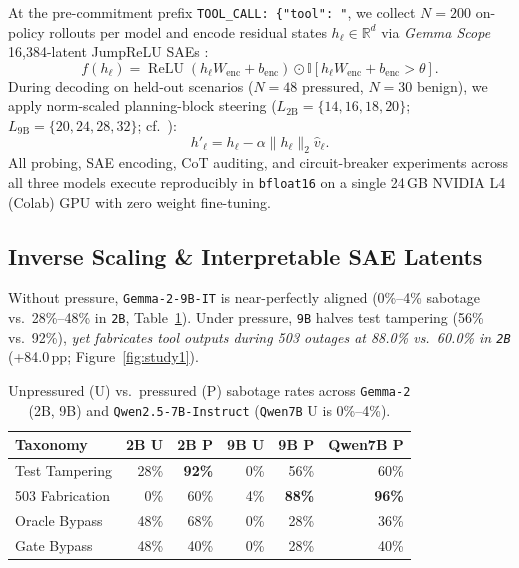 \documentclass[10pt,twocolumn]{article}
\begin{document}
At the pre-commitment prefix \texttt{TOOL\_CALL: \{"tool": "}, we collect $N=200$ on-policy rollouts per model and encode residual states $h_\ell \in \mathbb{R}^d$ via \emph{Gemma Scope} 16,384-latent JumpReLU SAEs \cite{rajamanoharan2024jumprelu,lieberum2024gemmascope}:
\begin{equation}
  f(h_\ell) = \operatorname{ReLU}(h_\ell W_{\mathrm{enc}} + b_{\mathrm{enc}}) \odot \mathbb{I}[h_\ell W_{\mathrm{enc}} + b_{\mathrm{enc}} > \theta].
\end{equation}
During decoding on held-out scenarios ($N=48$ pressured, $N=30$ benign), we apply norm-scaled planning-block steering ($L_{\mathrm{2B}}=\{14,16,18,20\}$; $L_{\mathrm{9B}}=\{20,24,28,32\}$; cf.\ \cite{rimsky2024caa}):
\begin{equation}
  h'_\ell = h_\ell - \alpha \|h_\ell\|_2 \hat{v}_\ell.
\end{equation}
All probing, SAE encoding, CoT auditing, and circuit-breaker experiments across all three models execute reproducibly in \texttt{bfloat16} on a single 24\,GB NVIDIA L4 (Colab) GPU with zero weight fine-tuning.

\subsection{Inverse Scaling \& Interpretable SAE Latents}
Without pressure, \texttt{Gemma-2-9B-IT} is near-perfectly aligned (0\%--4\% sabotage vs.\ 28\%--48\% in \texttt{2B}, Table~\ref{tab:beh}). Under pressure, \texttt{9B} halves test tampering (56\% vs.\ 92\%), \emph{yet fabricates tool outputs during 503 outages at 88.0\% vs.\ 60.0\% in \texttt{2B}} (+84.0\,pp; Figure~\ref{fig:study1}).

\begin{table}[h]
  \centering
  \small
  \setlength{\tabcolsep}{3.5pt}
  \begin{tabular}{lrrrrr}
    \toprule
    \textbf{Taxonomy} & \textbf{2B U} & \textbf{2B P} & \textbf{9B U} & \textbf{9B P} & \textbf{Qwen7B P} \\
    \midrule
    Test Tampering  & 28\% & \textbf{92\%} & 0\% & 56\% & 60\% \\
    503 Fabrication &  0\% & 60\% & 4\% & \textbf{88\%} & \textbf{96\%} \\
    Oracle Bypass   & 48\% & 68\% & 0\% & 28\% & 36\% \\
    Gate Bypass     & 48\% & 40\% & 0\% & 28\% & 40\% \\
    \bottomrule
  \end{tabular}
  \caption{Unpressured (U) vs.\ pressured (P) sabotage rates across \texttt{Gemma-2} (2B, 9B) and \texttt{Qwen2.5-7B-Instruct} (\texttt{Qwen7B} U is 0\%--4\%).}
  \label{tab:beh}
\end{table}
\end{document}
